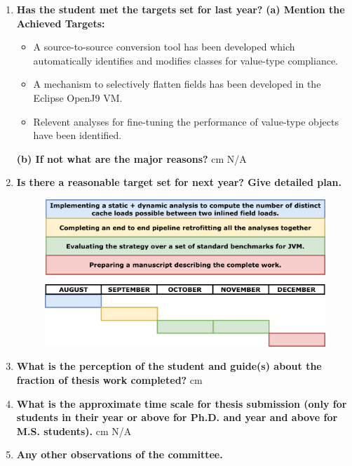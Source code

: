 \documentclass[12 pt, a4paper]{article}
\begin{document}
\begin{enumerate}
    \item \textbf{Has the student met the targets set for last year?}
    \vskip 0.2cm
	\textbf{(a) Mention the Achieved Targets:}
	
	\begin{itemize}
	    \item A source-to-source conversion tool has been developed 
		which automatically identifies and modifies classes for value-type compliance.
	    \item A mechanism to selectively flatten fields has been developed in
	    the Eclipse OpenJ9 VM.
		\item Relevent analyses for fine-tuning the performance of value-type
		 objects have been identified.
	\end{itemize}
	\textbf{(b) If not what are the major reasons?}
	\vskip 0.2cm
	 cm N/A
	\vspace{0.2cm}
	\item \textbf{Is there a reasonable target set for next year? Give detailed plan.}
	\begin{figure}[h]
    \centering  
    \includegraphics[scale=0.25]{Images/Gantt_Chart.jpg}
    \end{figure}
	\item \textbf{What is the perception of the student and guide(s) about the fraction of thesis work completed?}
	\vskip 0.5cm
	\phantom{"Placeholder for data."}
	 cm 
	\item\textbf{What is the approximate time scale for thesis submission (only for students in their
		\bf {} year or above for Ph.D. and  year and above for M.S. students).}
	\vskip 0.2cm
	 cm N/A
	\item\bf{Any other observations of the committee.}
	\vspace*{1.0 cm}


\end{enumerate}
\clearpage
\end{document}
